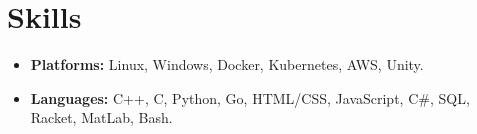 \section*{Skills}
\begin{itemize}
    \item
        \textbf{Platforms:} Linux, Windows, Docker, Kubernetes, AWS, Unity.
    \item
        \textbf{Languages:} C++, C, Python, Go, HTML/CSS, JavaScript, C\#, SQL, Racket, MatLab, Bash.
\end{itemize}
